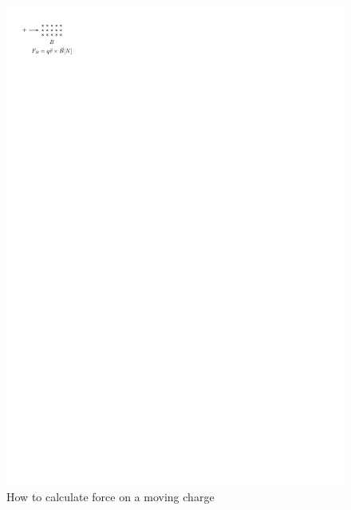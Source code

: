 \documentclass{article}
\begin{document}
\begin{itemize}
\begin{figure}[H]
        \includegraphics{figures/force-on-moving-charge.pdf}
        \caption{How to calculate force on a moving charge}
      \end{figure}
      \begin{figure}[H]
        \centering

\end{figure}
\end{itemize}
\end{document}
